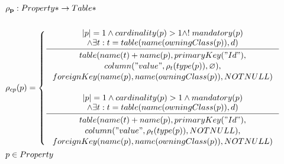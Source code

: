 \documentclass[11pt]{article}
\begin{document}
\begin{align*}
&	\mathbf{\rho_p} : Property* \rightarrow Table* \\ \\
&	\rho_{cp}(p) = \begin{cases}
     	\inference{|p| = 1 \wedge cardinality(p) > 1 \wedge !\;mandatory(p) \\ 
     		\wedge 	\exists t : t = table(name(owningClass(p)), d)
     		}{\begin{gathered}
     			table(name(t)+name(p), primaryKey("Id"), \\ column("value", \rho_t(type(p)), \varnothing), \\ foreignKey(name(p), 			name(owningClass(p)), NOTNULL) \\
    	\end{gathered}}\\ \\
     	\inference{|p| = 1 \wedge  cardinality(p) > 1 \wedge mandatory(p) \\ 
     		\wedge \exists t : t = table(name(owningClass(p)), d) 
     		}{\begin{gathered}  
     			table(name(t)+name(p), primaryKey("Id"), \\ 
     			column("value", \rho_t(type(p)), NOTNULL), \\ 			foreignKey(name(p), name(owningClass(p)), NOTNULL)
    	 \end{gathered}}
 	\end{cases}\\
& 	p \in Property
\end{align*}
\end{document}
